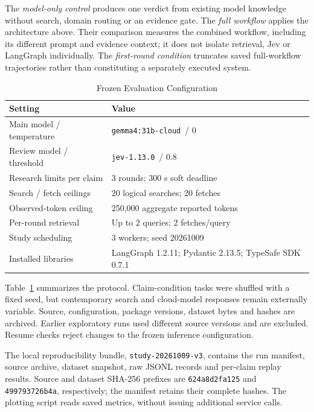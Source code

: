 \documentclass[conference]{IEEEtran}
\newcommand{\modelname}{\texttt{gemma4:31b-cloud}}
\newcommand{\jevname}{\texttt{jev-1.13.0}}
\begin{document}
The \emph{model-only control} produces one verdict from existing model knowledge without search, domain routing or an evidence gate. The \emph{full workflow} applies the architecture above. Their comparison measures the combined workflow, including its different prompt and evidence context; it does not isolate retrieval, Jev or LangGraph individually. The \emph{first-round condition} truncates saved full-workflow trajectories rather than constituting a separately executed system.

\begin{table}[t]
\caption{Frozen Evaluation Configuration}
\label{tab:protocol}
\centering
\footnotesize
\begin{tabular}{@{}p{}p{}@{}}
\toprule
Setting & Value\\
\midrule
Main model / temperature & \modelname\ / 0\\
Review model / threshold & \jevname\ / 0.8\\
Research limits per claim & 3 rounds; 300 s soft deadline\\
Search / fetch ceilings & 20 logical searches; 20 fetches\\
Observed-token ceiling & 250,000 aggregate reported tokens\\
Per-round retrieval & Up to 2 queries; 2 fetches/query\\
Study scheduling & 3 workers; seed 20261009\\
Installed libraries & LangGraph 1.2.11; Pydantic 2.13.5; TypeSafe SDK 0.7.1\\
\bottomrule
\end{tabular}
\end{table}

Table~\ref{tab:protocol} summarizes the protocol. Claim-condition tasks were shuffled with a fixed seed, but contemporary search and cloud-model responses remain externally variable. Source, configuration, package versions, dataset bytes and hashes are archived. Earlier exploratory runs used different source versions and are excluded. Resume checks reject changes to the frozen inference configuration.

The local reproducibility bundle, \texttt{study-20261009-v3}, contains the run manifest, source archive, dataset snapshot, raw JSONL records and per-claim replay results. Source and dataset SHA-256 prefixes are \texttt{624a8d2fa125} and \texttt{499793726b4a}, respectively; the manifest retains their complete hashes. The plotting script reads saved metrics, without issuing additional service calls.
\end{document}
